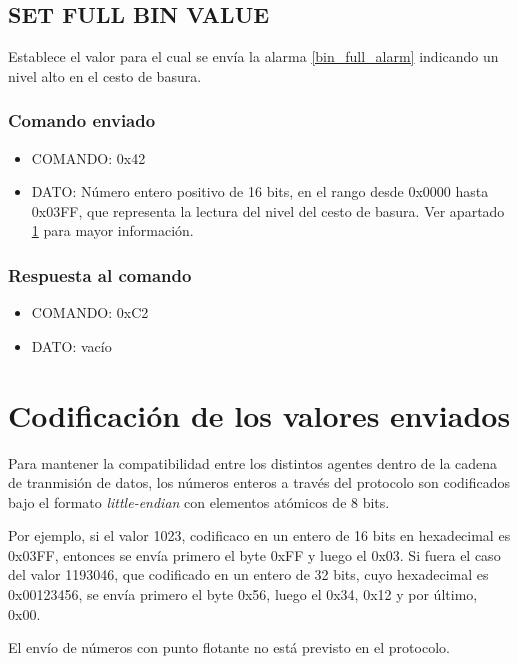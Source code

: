 \documentclass[a4paper,10pt]{article}
\begin{document}
\subsection{SET FULL BIN VALUE}
\label{set_battery_empty_value}

Establece el valor para el cual se env\'ia la alarma \ref{bin_full_alarm} indicando un nivel alto en el cesto de basura.

\subsubsection*{Comando enviado}

\begin{itemize}
	\item{COMANDO:} 0x42
	\item{DATO:} N\'umero entero positivo de 16 bits, en el rango desde 0x0000 hasta 0x03FF,
		que representa la lectura del nivel del cesto de basura.
		Ver apartado \ref{codificacion} para mayor informaci\'on.
\end{itemize}

\subsubsection*{Respuesta al comando}

\begin{itemize}
	\item{COMANDO:} 0xC2
	\item{DATO:} vac\'io
\end{itemize}

\section{Codificaci\'on de los valores enviados}
\label{codificacion}

Para mantener la compatibilidad entre los distintos agentes dentro de la cadena de tranmisi\'on de datos,
los n\'umeros enteros a trav\'es del protocolo son codificados bajo el formato \emph{little-endian} con elementos at\'omicos de 8 bits.

Por ejemplo, si el valor 1023, codificaco en un entero de 16 bits en hexadecimal es 0x03FF,
entonces se env\'ia primero el byte 0xFF y luego el 0x03.
Si fuera el caso del valor 1193046, que codificado en un entero de 32 bits, cuyo hexadecimal es 0x00123456,
se env\'ia primero el byte 0x56, luego el 0x34, 0x12 y por \'ultimo, 0x00.

El env\'io de n\'umeros con punto flotante no est\'a previsto en el protocolo.
\end{document}
